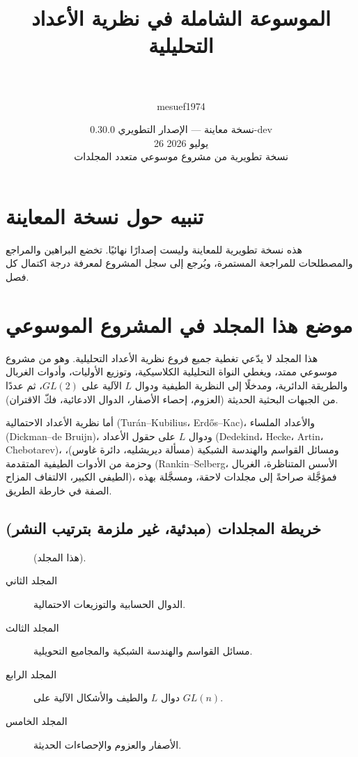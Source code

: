 \documentclass[12pt,oneside]{book}
\title{الموسوعة الشاملة في نظرية الأعداد التحليلية\\
\large \volumenumber\\
\large \volumetitle}
\author{mesuef1974}
\date{نسخة معاينة — الإصدار التطويري 0.30.0-dev\\26 يوليو 2026\\
\normalsize نسخة تطويرية من مشروع موسوعي متعدد المجلدات}
\begin{document}
\frontmatter
\maketitle
\chapter*{تنبيه حول نسخة المعاينة}
هذه نسخة تطويرية للمعاينة وليست إصدارًا نهائيًا. تخضع البراهين والمراجع والمصطلحات للمراجعة المستمرة، ويُرجع إلى سجل المشروع لمعرفة درجة اكتمال كل فصل.

\chapter*{موضع هذا المجلد في المشروع الموسوعي}
هذا المجلد لا يدّعي تغطية جميع فروع نظرية الأعداد التحليلية. وهو \textbf{\volumenumber} من مشروع موسوعي ممتد، ويغطي النواة التحليلية الكلاسيكية، وتوزيع الأوليات، وأدوات الغربال والطريقة الدائرية، ومدخلًا إلى النظرية الطيفية ودوال \(L\) الآلية على \(GL(2)\)، ثم عددًا من الجبهات البحثية الحديثة (العزوم، إحصاء الأصفار، الدوال الادعائية، فكّ الاقتران).

أما نظرية الأعداد الاحتمالية (Turán--Kubilius، Erdős--Kac)، والأعداد الملساء (Dickman--de Bruijn)، ودوال \(L\) على حقول الأعداد (Dedekind، Hecke، Artin، Chebotarev)، ومسائل القواسم والهندسة الشبكية (مسألة ديريشليه، دائرة غاوس)، وحزمة من الأدوات الطيفية المتقدمة (Rankin--Selberg، الأسس المتناظرة، الغربال الطيفي الكبير، الالتفاف المزاح)، فمؤجَّلة صراحةً إلى مجلدات لاحقة، ومسجَّلة بهذه الصفة في خارطة الطريق.

{}
\section*{خريطة المجلدات (مبدئية، غير ملزمة بترتيب النشر)}
\begin{description}
  \item[\volumenumber] \volumetitle{} (هذا المجلد).
  \item[المجلد الثاني] الدوال الحسابية والتوزيعات الاحتمالية.
  \item[المجلد الثالث] مسائل القواسم والهندسة الشبكية والمجاميع التحويلية.
  \item[المجلد الرابع] دوال \(L\) والطيف والأشكال الآلية على \(GL(n)\).
  \item[المجلد الخامس] الأصفار والعزوم والإحصاءات الحديثة.
\end{description}
\end{document}
